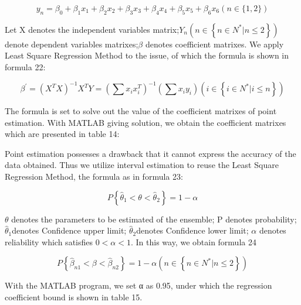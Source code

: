\begin{equation}
y _ { n } = \beta _ { 0 } + \beta _ { 1 } x _ { 1 } + \beta _ { 2 } x _ { 2 } + \beta _ { 3 } x _ { 3 } + \beta _ { 4 } x _ { 4 } + \beta _ { 5 } x _ { 5 } + \beta _ { 6 } x _ { 6 } ( n \in \{ 1,2 \} )
\end{equation}

Let X denotes the independent variables matrix;$Y _ { n } \left( n \in \left\{ n \in N ^ { * } | n \leq 2 \right\} \right)$denote dependent variables matrixes;$\beta$ denotes coefficient matrixes. We apply Least Square Regression Method to the issue, of which the formula is shown in formula 22:

\begin{equation}
\beta ^ { \prime } = \left( X ^ { T } X \right) ^ { - 1 } X ^ { T } Y = \left( \sum x _ { i } x _ { i } ^ { T } \right) ^ { - 1 } \left( \sum x _ { i } y _ { i } \right) \left( i \in \left\{ i \in N ^ { * } | i \leq n \right\} \right)
\end{equation}

The formula is set to solve out the value of the coefficient matrixes of point estimation. With MATLAB giving solution, we obtain the coefficient matrixes which are presented in table 14:

Point estimation possesses a drawback that it cannot express the accuracy of the data obtained. Thus we utilize interval estimation to reuse the Least Square Regression Method, the formula as in formula 23:

\begin{equation}
P \left\{ \hat { \theta } _ { 1 } < \theta < \widehat { \theta } _ { 2 } \right\} = 1 - \alpha
\end{equation}

$\theta$ denotes the parameters to be estimated of the ensemble; P denotes probability; $\hat { \theta } _ { 1 }$denotes Confidence upper limit; $\hat { \theta } _ { 2 }$denotes Confidence lower limit; $\alpha$ denotes reliability which satisfies $0 < \alpha < 1$. In this way, we obtain formula 24

\begin{equation}
P \left\{ \hat { \beta } _ { n 1 } < \beta < \hat { \beta } _ { n 2 } \right\} = 1 - \alpha \left( n \in \left\{ n \in N ^ { * } | n \leq 2 \right\} \right)
\end{equation}

With the MATLAB program, we set α as 0.95, under which the regression coefficient bound is shown in table 15.

